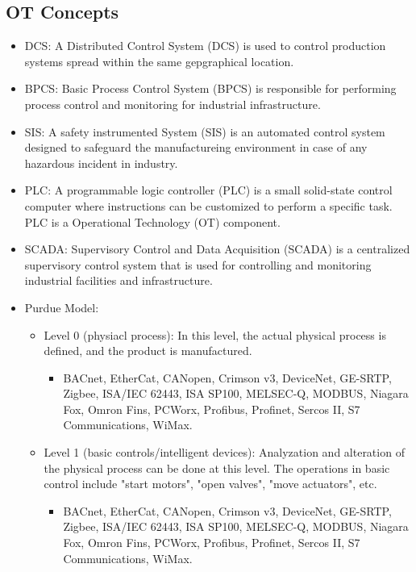 \subsection{OT Concepts}
\begin{itemize}
    \item DCS: A Distributed Control System (DCS) is used to control production systems spread within the same gepgraphical location.
    \item BPCS: Basic Process Control System (BPCS) is responsible for performing process control and monitoring for industrial infrastructure.
    \item SIS: A safety instrumented System (SIS) is an automated control system designed to safeguard the manufactureing environment in case of any hazardous incident in industry.
    \item PLC: A programmable logic controller (PLC) is a small solid-state control computer where instructions can be customized to perform a specific task. PLC is a Operational Technology (OT) component.
    \item SCADA: Supervisory Control and Data Acquisition (SCADA) is a centralized supervisory control system that is used for controlling and monitoring industrial facilities and infrastructure.
    \item Purdue Model:
    \begin{itemize}
        \item Level 0 (physiacl process): In this level, the actual physical process is defined, and the product is manufactured.
        \begin{itemize}
            \item BACnet, EtherCat, CANopen, Crimson v3, DeviceNet, GE-SRTP, Zigbee, ISA/IEC 62443, ISA SP100, MELSEC-Q, MODBUS, Niagara Fox, Omron Fins, PCWorx, Profibus, Profinet, Sercos II, S7 Communications, WiMax.
        \end{itemize}
        \item Level 1 (basic controls/intelligent devices): Analyzation and alteration of the physical process can be done at this level. The operations in basic control include "start motors", "open valves", "move actuators", etc.
        \begin{itemize}
            \item BACnet, EtherCat, CANopen, Crimson v3, DeviceNet, GE-SRTP, Zigbee, ISA/IEC 62443, ISA SP100, MELSEC-Q, MODBUS, Niagara Fox, Omron Fins, PCWorx, Profibus, Profinet, Sercos II, S7 Communications, WiMax.
        \end{itemize}

\end{itemize}
\end{itemize}
